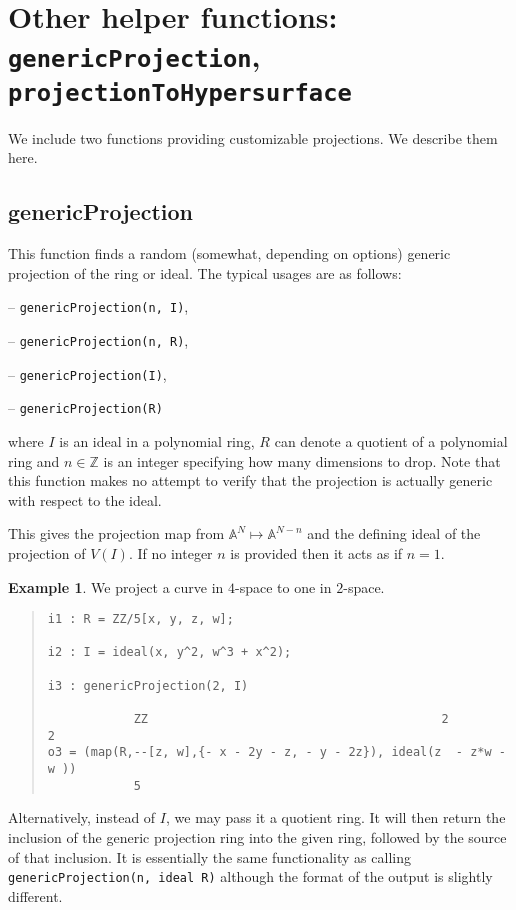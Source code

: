 \documentclass[11pt]{amsart}
\theoremstyle{definition}
\newtheorem{example}{Example}[section]
\begin{document}
\section{Other helper functions: {\tt genericProjection}, {\tt projectionToHypersurface}}\label{projectionfunctions}

We include two functions providing customizable projections. We describe them here. 


\subsection{genericProjection} 
This function finds a random (somewhat, depending on options) generic projection of the ring or ideal.
The typical usages are as follows: 
\vspace{0.5em}

-- {\tt genericProjection(n, I)},

-- {\tt genericProjection(n, R)},


-- {\tt genericProjection(I)},  

-- {\tt genericProjection(R)} 

\vspace{0.5em}
\noindent where 
$I$ is an ideal 
in a polynomial ring, 
$R$ can denote a quotient of a polynomial ring and 
$n\in \mathbb{Z}$ is
an integer specifying how many dimensions to drop.  Note that this function makes no attempt to verify that the projection is actually generic with respect to the ideal.


This gives the projection map from $\mathbb{A}^N \mapsto\mathbb{A}^{N-n}$ and the defining ideal of the projection of $V(I)$. If no integer $n$ is provided then it acts as if $n = 1$. 


\begin{example}	
    We project a curve in $4$-space to one in $2$-space.
    ~~
  {{\small\color{blue}
  \begin{quote}
\begin{verbatim}
i1 : R = ZZ/5[x, y, z, w];

i2 : I = ideal(x, y^2, w^3 + x^2);

i3 : genericProjection(2, I)

            ZZ                                         2          2
o3 = (map(R,--[z, w],{- x - 2y - z, - y - 2z}), ideal(z  - z*w - w ))                   
            5
\end{verbatim}
\end{quote}
    }}
\end{example}\vspace{-1em}
Alternatively, instead of {$I$}, we may pass it a quotient ring.  It will then return the inclusion of the generic projection ring into the given ring, followed by the source of that inclusion.  It is essentially the same functionality as calling {\tt genericProjection(n, ideal R)} although the format of the output is slightly different. 
\end{document}
